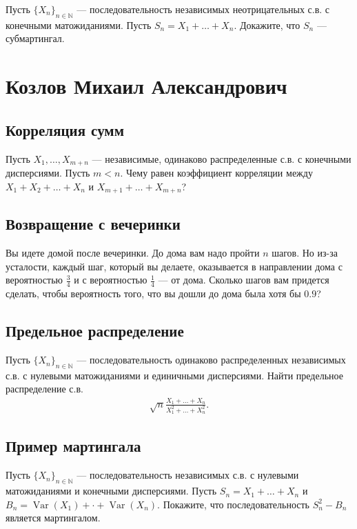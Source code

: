 \documentclass[12pt]{article}
\newcommand\N{\mathbb{N}}
\DeclareMathOperator{\Var}{Var}
\begin{document}
Пусть $\{X_n\}_{n \in \N}$ --- последовательность независимых неотрицательных с.в. с конечными матожиданиями. Пусть $S_n = X_1 + \dots + X_n$. Докажите, что $S_n$ --- субмартингал.

\newpage
\section{Козлов Михаил Александрович}

\subsection{Корреляция сумм}

Пусть $X_1, \dots, X_{m + n}$ --- независимые, одинаково распределенные с.в. с конечными дисперсиями. Пусть $m < n$. Чему равен коэффициент корреляции между $X_1 + X_2 + \dots + X_n$ и $X_{m + 1} + \dots + X_{m + n}$?

\subsection{Возвращение с вечеринки}

Вы идете домой после вечеринки. До дома вам надо пройти $n$ шагов. Но из-за усталости, каждый шаг, который вы делаете, оказывается в направлении дома с вероятностью $\frac{3}{4}$ и с вероятностью $\frac{1}{4}$ --- от дома. Сколько шагов вам придется сделать, чтобы вероятность того, что вы дошли до дома была хотя бы $0.9$?

\subsection{Предельное распределение}

Пусть $\{X_n\}_{n \in \N}$ --- последовательность одинаково распределенных независимых с.в. с нулевыми матожиданиями и единичными дисперсиями. Найти предельное распределение с.в.
\begin{align*}
    \sqrt{n}\frac{X_1 + \dots + X_n}{X_1^2 + \dots + X_n^2}.
\end{align*}

\subsection{Пример мартингала}

Пусть $\{X_n\}_{n \in \N}$ --- последовательность независимых с.в. с нулевыми матожиданиями и конечными дисперсиями. Пусть $S_n = X_1 + \dots + X_n$ и $B_n = \Var(X_1) + \cdot + \Var(X_n)$. Покажите, что последовательность $S_n^2 - B_n$ является мартингалом.
\end{document}
